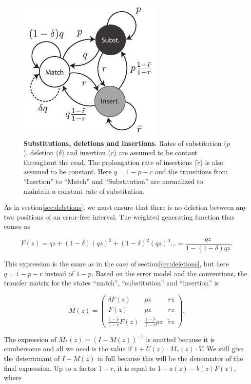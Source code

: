 \documentclass{article}
\begin{document}
\begin{figure}[h]
\centering
\includegraphics[scale=0.9]{insertions.pdf}
\caption{\textbf{Substitutions, deletions and insertions}. Rates of
substitution ($p$), deletion ($\delta$) and insertion ($r$) are assumed to
be contant throughout the read. The prolongation rate of insertions
($\tilde{r}$) is also assumed to be constant. Here $q = 1-p-r$ and the
transitions from ``Inertion'' to ``Match'' and ``Substitution'' are
normalized to maintain a constant rate of substitution.}
\label{fig:insertions}
\end{figure}

As in section\ref{sec:deletions}, we must ensure that there is no deletion
between any two positions of an error-free interval. The weighted
generating function thus comes as

\begin{equation*}
F(z) = qz + (1-\delta)(qz)^2 + (1-\delta)^2(qz)^3 \ldots =
\frac{qz}{1-(1-\delta)qz}.
\end{equation*}

This expression is the same as in the case of section\ref{sec:deletions},
but here $q = 1-p-r$ instead of $1-p$. Based on the error model and the
conventions, the transfer matrix for the states ``match'',
``substitution'' and ``insertion'' is

\begin{equation*}
M(z) = \left(
\begin{matrix}
\delta F(z) & pz      & rz  \\
F(z)        & pz      & rz  \\
\frac{1-\tilde{r}}{1-r}F(z)   & \frac{1-\tilde{r}}{1-r}pz & \tilde{r}z
\end{matrix}
\right).
\end{equation*}

The expression of $M_*(z) = (I-M(z))^{-1}$ is omitted because it is
cumbersome and all we need is the value if $1+U(z)\cdot M_*(z)\cdot V$.
We still give the determinant of $I-M(z)$ in full because this will be the
denomiator of the final expression. Up to a factor $1-r$, it is equal to
$1-a(z)-b(z)F(z)$, where
\end{document}

